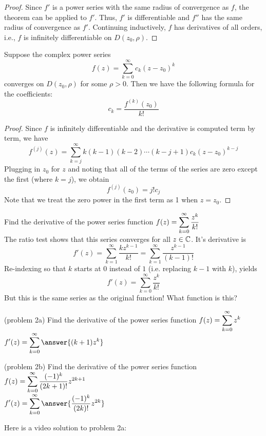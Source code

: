 \documentclass[handout]{ximera}
\begin{document}
\begin{proof}
Since $f'$ is a power series with the same radius of convergence as $f$, the theorem can be applied to $f'$. Thus,
$f'$ is differentiable and $f''$ has the same radius of convergence as $f'$. Continuing inductively, $f$
has derivatives of all orders, i.e., $f$ is infinitely differentiable on $D(z_0, \rho)$.
\end{proof}

\begin{corollary}
Suppose the complex power series
\[
f(z) = \sum_{k=0}^\infty c_k(z-z_0)^k
\]
converges on $D(z_0, \rho)$ for some $\rho > 0$. Then we have the following formula for the coefficients:
\[
c_k = \frac{f^{(k)}(z_0)}{k!}
\]
\end{corollary}
\begin{proof}
Since $f$ is infinitely differentiable and the derivative is computed term by term, we have
\[
f^{(j)}(z) = \sum_{k=j}^\infty k(k-1)(k-2)\cdots(k-j+1)c_k(z-z_0)^{k-j}
\]
Plugging in $z_0$ for $z$ and noting that all of the terms of the series are zero except the first (where $k = j$),
we obtain
\[
f^{(j)}(z_0) = j!c_j
\]
Note that we treat the zero power in the first term as 1 when $z=z_0$.
\end{proof}

\begin{example}[example 2]
Find the derivative of the power series function $\displaystyle f(z) = \sum_{k=0}^\infty \frac{z^k}{k!}$\\
The ratio test shows that this series converges for all $z \in \mathbb C$. It's derivative is
\[
f'(z) = \sum_{k=1}^\infty\frac{kz^{k-1}}{k!}= \sum_{k=1}^\infty \frac{z^{k-1}}{(k-1)!}
\]
Re-indexing so that $k$ starts at $0$ instead of $1$ (i.e. replacing $k-1$ with $k$), yields
\[
f'(z) = \sum_{k=0}^\infty \frac{z^k}{k!}
\]
But this is the same series as the original function! What function is this?
\end{example}

\begin{problem}(problem 2a)
Find the derivative of the power series function $\displaystyle f(z) = \sum_{k=0}^\infty z^k$\\
$\dis f'(z) = \sum_{k=0}^\infty \answer{(k+1)z^k}$
\end{problem}

\begin{problem}(problem 2b)
Find the derivative of the power series function $\displaystyle f(z) = \sum_{k=0}^\infty \frac{(-1)^k}{(2k+1)!}z^{2k+1}$\\
$\dis f'(z) = \sum_{k=0}^\infty \answer{\frac{(-1)^k}{(2k)!}z^{2k}}$
\end{problem}

Here is a video solution to problem 2a:\\
\begin{foldable}
\end{foldable}
\end{document}
